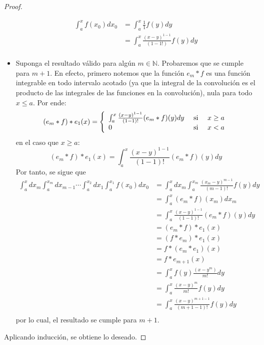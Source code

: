 \documentclass[12pt]{report}
\newcounter{it}
\theoremstyle{largebreak}
\begin{document}
\begin{proof}
\begin{itemize}
            \begin{equation*}
                \begin{split}
                    \int_{a}^{ x}f(x_0)dx_0&=\int_{a}^{ x}\frac{1}{1}f(y)dy\\
                    &=\int_{a}^{ x}\frac{(x-y)^{1-1}}{(1-1!)}f(y)dy\\
                \end{split}
            \end{equation*}
            \item Suponga el resultado válido para algún $m\in\mathbb{N}$. Probaremos que se cumple para $m+1$. En efecto, primero notemos que la función $e_m*f$ es una función integrable en todo intervalo acotado (ya que la integral de la convolución es el producto de las integrales de las funciones en la convolución), nula para todo $x\leq a$. Por ende:
            \begin{equation*}
                (e_m*f)*e_1(x)=\left\{
                    \begin{array}{lcr}
                        \int_{a}^x\frac{(x-y)^{1-1}}{(1-1)!}(e_m*f)(y)dy & \textup{ si } & x\geq a \\
                        0 & \textup{ si }&x<a\\
                    \end{array}
                \right.
            \end{equation*}
            en el caso que $x\geq a$:
            \begin{equation*}
                (e_m*f)*e_1(x)=\int_{a}^x\frac{(x-y)^{1-1}}{(1-1)!}(e_m*f)(y)dy
            \end{equation*}
            Por tanto, se sigue que
            \begin{equation*}
                \begin{split}
                    \int_{a}^xdx_{ m}\int_a^{ x_{m}}dx_{m-1}\cdots\int_{a}^{x_{2}} dx_{1}\int_a^{ x_1}f(x_0)dx_0&=\int_{a}^xdx_{ m}\int_a^{x_m}\frac{(x_m-y)^{m-1}}{(m-1)!}f(y)dy\\
                    &=\int_{a}^x(e_m*f)(x_m)dx_m\\
                    &=\int_{a}^x\frac{(x-y)^{1-1}}{(1-1)!}(e_m*f)(y)dy\\
                    &=(e_m*f)*e_1(x)\\
                    &=(f*e_m)*e_1(x)\\
                    &=f*(e_m*e_1)(x)\\
                    &=f*e_{ m+1}(x)\\
                    &=\int_a^xf(y)\frac{(x-y^m)}{m!}dy\\
                    &=\int_a^x\frac{(x-y)^m}{m!}f(y)dy\\
                    &=\int_a^x\frac{(x-y)^{m+1-1}}{(m+1-1)!}f(y)dy\\
                \end{split}
            \end{equation*}
            por lo cual, el resultado se cumple para $m+1$.
        \end{itemize}
        Aplicando inducción, se obtiene lo deseado.
    \end{proof}
\end{document}
